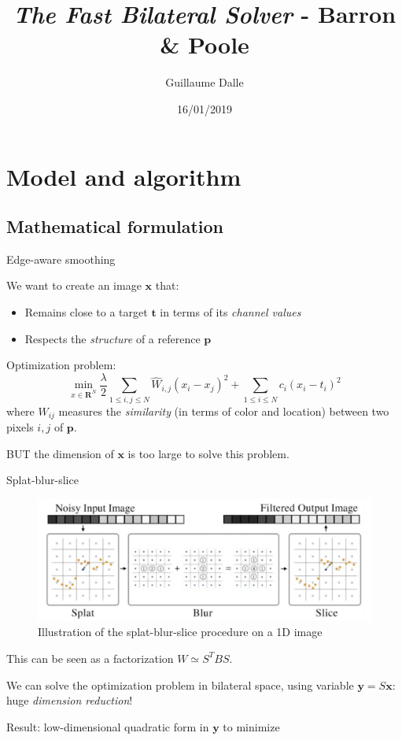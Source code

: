\documentclass{beamer}
\title[The Fast Bilateral Solver]{\textit{The Fast Bilateral Solver}
- Barron \& Poole}
\author{Guillaume Dalle}
\institute{MVA - Imagerie numérique}
\date{16/01/2019}
\begin{document}
\begin{frame}
\titlepage
\end{frame}

\section{Model and algorithm}

\subsection{Mathematical formulation}

\begin{frame}{Edge-aware smoothing}

We want to create an image $\textbf{x}$ that:
\begin{itemize}
    \item Remains close to a target $\textbf{t}$ in terms of its \textit{channel values}
    \item Respects the \textit{structure} of a reference $\textbf{p}$
\end{itemize}

\pause
Optimization problem:
$$\min_{x \in \textbf{R}^N} \frac{\lambda}{2} \sum_{1 \leq i, j \leq N}{\hat{W}_{i, j} (x_i - x_j)^2} + \sum_{1 \leq i \leq N}{c_i (x_i - t_i)^2}$$
where $W_{ij}$ measures the \textit{similarity} (in terms of color and location) between two pixels $i,j$ of $\textbf{p}$.

\pause
BUT the dimension of $\textbf{x}$ is too large to solve this problem.
\end{frame}

\begin{frame}{Splat-blur-slice}
\begin{figure}
\centering
\includegraphics[width=0.8\linewidth]{pictures/SBS.png}
\caption{Illustration of the splat-blur-slice procedure on a 1D image}
\end{figure}

\pause
This can be seen as a factorization $W \simeq S^T B S$.

We can solve the optimization problem in bilateral space, using variable $\textbf{y} = S \textbf{x}$: huge \textit{dimension reduction}!

Result: low-dimensional quadratic form in $\textbf{y}$ to minimize
\end{frame}
\end{document}
